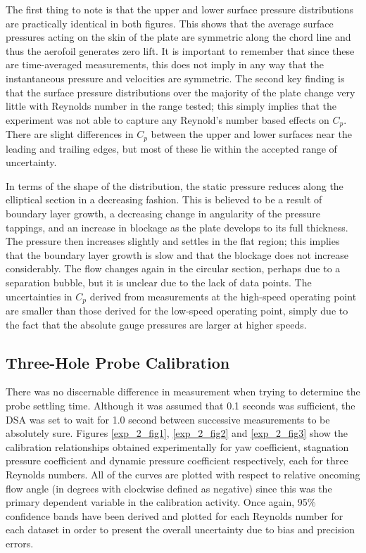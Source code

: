 \documentclass[11pt,a4paper,twocolumn]{article}
\begin{document}
The first thing to note is that the upper and lower surface pressure distributions are practically identical in both figures. This shows that the average surface pressures acting on the skin of the plate are symmetric along the chord line and thus the aerofoil generates zero lift. It is important to remember that since these are time-averaged measurements, this does not imply in any way that the instantaneous pressure and velocities are symmetric. The second key finding is that the surface pressure distributions over the majority of the plate change very little with Reynolds number in the range tested; this simply implies that the experiment was not able to capture any Reynold’s number based effects on $C_p$. There are slight differences in $C_p$ between the upper and lower surfaces near the leading and trailing edges, but most of these lie within the accepted range of uncertainty. 

In terms of the shape of the distribution, the static pressure reduces along the elliptical section in a decreasing fashion. This is believed to be a result of boundary layer growth, a decreasing change in angularity of the pressure tappings, and an increase in blockage as the plate develops to its full thickness. The pressure then increases slightly and settles in the flat region; this implies that the boundary layer growth is slow and that the blockage does not increase considerably. The flow changes again in the circular section, perhaps due to a separation bubble, but it is unclear due to the lack of data points. The uncertainties in $C_p$ derived from measurements at the high-speed operating point are smaller than those derived for the low-speed operating point, simply due to the fact that the absolute gauge pressures are larger at higher speeds. 

\subsection{Three-Hole Probe Calibration}
There was no discernable difference in measurement when trying to determine the probe settling time. Although it was assumed that 0.1 seconds was sufficient, the DSA was set to wait for 1.0 second between successive measurements to be absolutely sure. Figures \ref{exp_2_fig1}, \ref{exp_2_fig2} and \ref{exp_2_fig3} show the calibration relationships obtained experimentally for yaw coefficient, stagnation pressure coefficient and dynamic pressure coefficient respectively, each for three Reynolds numbers. All of the curves are plotted with respect to relative oncoming flow angle (in degrees with clockwise defined as negative) since this was the primary dependent variable in the calibration activity. Once again, 95\% confidence bands have been derived and plotted for each Reynolds number for each dataset in order to present the overall uncertainty due to bias and precision errors. 
\end{document}

